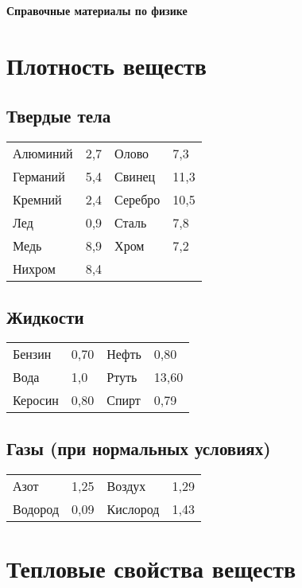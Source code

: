 \documentclass[a4paper,12pt]{article}
\begin{document}
\begin{center}
\Large\textbf{Справочные материалы по физике}
\end{center}

\section*{Плотность веществ}

\subsection*{Твердые тела}
\begin{tabular}{@{}llll@{}}
Алюминий & 2,7  & Олово & 7,3 \\
Германий & 5,4  & Свинец & 11,3 \\
Кремний & 2,4   & Серебро & 10,5 \\
Лед & 0,9      & Сталь & 7,8 \\
Медь & 8,9     & Хром & 7,2 \\
Нихром & 8,4   & & \\
\end{tabular}

\subsection*{Жидкости}
\begin{tabular}{@{}llll@{}}
Бензин & 0,70 & Нефть & 0,80 \\
Вода & 1,0    & Ртуть & 13,60 \\
Керосин & 0,80 & Спирт & 0,79 \\
\end{tabular}

\subsection*{Газы (при нормальных условиях)}
\begin{tabular}{@{}llll@{}}
Азот & 1,25 & Воздух & 1,29 \\
Водород & 0,09 & Кислород & 1,43 \\
\end{tabular}

\section*{Тепловые свойства веществ}
\end{document}
